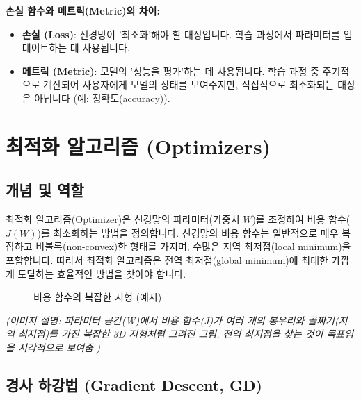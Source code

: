 \documentclass[11pt,a4paper]{article}
\theoremstyle{definition}
\begin{document}
\begin{infobox}
\textbf{손실 함수와 메트릭(Metric)의 차이:}
\begin{itemize}
    \item \textbf{손실 (Loss)}: 신경망이 '최소화'해야 할 대상입니다. 학습 과정에서 파라미터를 업데이트하는 데 사용됩니다.
    \item \textbf{메트릭 (Metric)}: 모델의 '성능을 평가'하는 데 사용됩니다. 학습 과정 중 주기적으로 계산되어 사용자에게 모델의 상태를 보여주지만, 직접적으로 최소화되는 대상은 아닙니다 (예: 정확도(accuracy)).
\end{itemize}
\end{infobox}

\newpage
\section*{최적화 알고리즘 (Optimizers)}

\subsection*{개념 및 역할}
최적화 알고리즘(Optimizer)은 신경망의 파라미터(가중치 $W$)를 조정하여 비용 함수($J(W)$)를 최소화하는 방법을 정의합니다.
신경망의 비용 함수는 일반적으로 매우 복잡하고 비볼록(non-convex)한 형태를 가지며, 수많은 지역 최저점(local minimum)을 포함합니다.
따라서 최적화 알고리즘은 전역 최저점(global minimum)에 최대한 가깝게 도달하는 효율적인 방법을 찾아야 합니다.

\begin{figure}[h!]
\centering
\caption{비용 함수의 복잡한 지형 (예시)}
\label{fig:cost_landscape}
\end{figure}
\begin{center}
\textit{(이미지 설명: 파라미터 공간(W)에서 비용 함수(J)가 여러 개의 봉우리와 골짜기(지역 최저점)를 가진 복잡한 3D 지형처럼 그려진 그림. 전역 최저점을 찾는 것이 목표임을 시각적으로 보여줌.)}
\end{center}

\subsection*{경사 하강법 (Gradient Descent, GD)}
\end{document}
